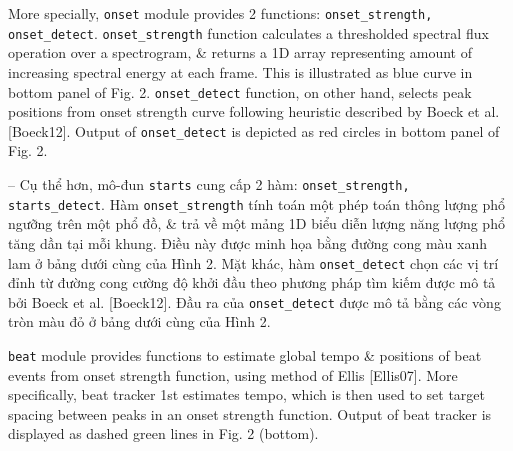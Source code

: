 \documentclass{article}
\begin{document}
\begin{itemize}
\begin{itemize}
		More specially, {\tt onset} module provides 2 functions: \verb|onset_strength, onset_detect|. \verb|onset_strength| function calculates a thresholded spectral flux operation over a spectrogram, \& returns a 1D array representing amount of increasing spectral energy at each frame. This is illustrated as blue curve in bottom panel of {\sf Fig. 2}. \verb|onset_detect| function, on other hand, selects peak positions from onset strength curve following heuristic described by Boeck et al. [Boeck12]. Output of \verb|onset_detect| is depicted as red circles in bottom panel of {\sf Fig. 2}.
		
		-- Cụ thể hơn, mô-đun {\tt starts} cung cấp 2 hàm: \verb|onset_strength, starts_detect|. Hàm \verb|onset_strength| tính toán một phép toán thông lượng phổ ngưỡng trên một phổ đồ, \& trả về một mảng 1D biểu diễn lượng năng lượng phổ tăng dần tại mỗi khung. Điều này được minh họa bằng đường cong màu xanh lam ở bảng dưới cùng của {\sf Hình 2}. Mặt khác, hàm \verb|onset_detect| chọn các vị trí đỉnh từ đường cong cường độ khởi đầu theo phương pháp tìm kiếm được mô tả bởi Boeck et al. [Boeck12]. Đầu ra của \verb|onset_detect| được mô tả bằng các vòng tròn màu đỏ ở bảng dưới cùng của {\sf Hình 2}.
		
		{\tt beat} module provides functions to estimate global tempo \& positions of beat events from onset strength function, using method of Ellis [Ellis07]. More specifically, beat tracker 1st estimates tempo, which is then used to set target spacing between peaks in an onset strength function. Output of beat tracker is displayed as dashed green lines in {\sf Fig. 2 (bottom)}.
		

\end{itemize}
\end{itemize}
\end{document}
